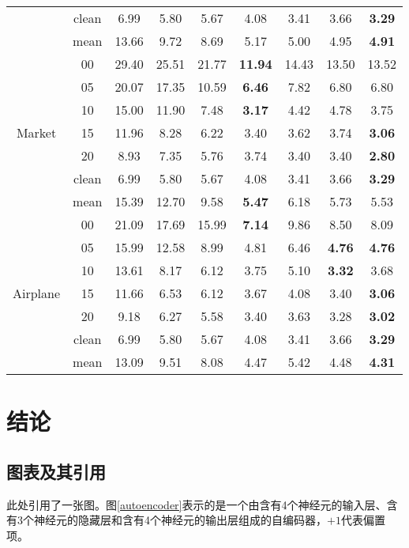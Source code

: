 \documentclass[a4paper,oneside,12pt]{book}
\begin{document}
\begin{table}
\begin{tabular}{| c | c | c | c| c|c| c| c|c|}
      & clean &6.99 &5.80 &5.67 &4.08 &3.41 &3.66 & \textbf{3.29}   \\ 
\cline{2-9}
	& mean &13.66 &9.72 &8.69 &5.17 &5.00 &4.95 & \textbf{4.91}   \\ 
 \hline 
      & 00 &29.40 &25.51 &21.77 & \textbf{11.94} &14.43 &13.50 &13.52   \\ 
      & 05 &20.07 &17.35 &10.59 & \textbf{6.46} &7.82 &6.80 &6.80   \\ 
      & 10 &15.00 &11.90 &7.48 & \textbf{3.17} &4.42 &4.78 &3.75   \\ 
Market  & 15 &11.96 &8.28 &6.22 &3.40 &3.62 &3.74 & \textbf{3.06}   \\ 
      & 20 &8.93 &7.35 &5.76 &3.74 &3.40 &3.40 & \textbf{2.80}   \\ 
      & clean &6.99 &5.80 &5.67 &4.08 &3.41 &3.66 & \textbf{3.29}   \\ 
\cline{2-9}    
    & mean &15.39 &12.70 &9.58 & \textbf{5.47} &6.18 &5.73 &5.53   \\ 
 \hline 
      & 00 &21.09 &17.69 &15.99 & \textbf{7.14} &9.86 &8.50 &8.09   \\ 
      & 05 &15.99 &12.58 &8.99 & 4.81 &6.46 &\textbf{4.76} &\textbf{4.76}   \\ 
      & 10 &13.61 &8.17 &6.12 & 3.75 &5.10 &\textbf{3.32} &3.68   \\ 
Airplane  & 15 &11.66 &6.53 &6.12 &3.67 &4.08 &3.40 & \textbf{3.06}   \\ 
      & 20 &9.18 &6.27 &5.58 &3.40 &3.63 &3.28 & \textbf{3.02}   \\ 
      & clean &6.99 &5.80 &5.67 &4.08 &3.41 &3.66 & \textbf{3.29}   \\ 
\cline{2-9}      
      & mean &13.09 &9.51 &8.08 &4.47 &5.42 &4.48 & \textbf{4.31}   \\ 
\hline
\end{tabular}
\end{table}


\chapter{结论}


\iffalse
\section{图表及其引用}


此处引用了一张图。图\ref{autoencoder}表示的是一个由含有4个神经元的输入层、含有3个神经元的隐藏层和含有4个神经元的输出层组成的自编码器，$+1$代表偏置项。
\end{document}
